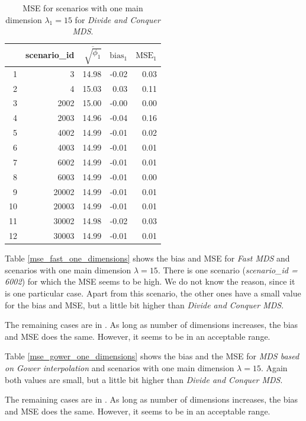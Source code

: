 \documentclass[11pt]{report}
\begin{document}
\begin{table}[ht]
\centering
\begin{tabular}{rrrrr}
 & scenario\_id & $\overline{\sqrt{\phi_1}}$ & $\mbox{bias}_1$ & $\mbox{MSE}_1$ \\ 
  \hline
  1 & 3 & 14.98 & -0.02 & 0.03 \\ 
  2 & 4 & 15.03 & 0.03 & 0.11 \\ 
  3 & 2002 & 15.00 & -0.00 & 0.00 \\ 
  4 & 2003 & 14.96 & -0.04 & 0.16 \\ 
  5 & 4002 & 14.99 & -0.01 & 0.02 \\ 
  6 & 4003 & 14.99 & -0.01 & 0.01 \\ 
  7 & 6002 & 14.99 & -0.01 & 0.01 \\ 
  8 & 6003 & 14.99 & -0.01 & 0.00 \\ 
  9 & 20002 & 14.99 & -0.01 & 0.01 \\ 
  10 & 20003 & 14.99 & -0.01 & 0.01 \\ 
  11 & 30002 & 14.98 & -0.02 & 0.03 \\ 
  12 & 30003 & 14.99 & -0.01 & 0.01 \\ 
   \hline
\end{tabular}
\caption{MSE for scenarios with one main dimension $\lambda_1 = 15$ for \textit{Divide and Conquer MDS}.}
\label{mse_divide_one_dimensions}
\end{table}

\indent Table \ref{mse_fast_one_dimensions} shows the bias and MSE for 
\textit{Fast MDS} and scenarios with one main dimension $\lambda = 15$. 
There is one scenario (\textit{scenario\_id = 6002}) for which the MSE 
seems to be high. We do not know the reason, since it is one particular case. 
Apart from this scenario, the other ones 
have a small value for the bias and MSE, but a little bit higher than 
\textit{Divide and Conquer MDS}.

\indent The remaining cases are in . As long as number of 
dimensions increases, the bias and MSE does the same. However, it seems to
be in an acceptable range.

\indent Table \ref{mse_gower_one_dimensions} shows the bias and the MSE for 
\textit{MDS based on Gower interpolation} and scenarios with one main 
dimension $\lambda = 15$. Again both values are small, but a little bit higher 
than \textit{Divide and Conquer MDS}.

\indent The remaining cases are in . As long as number of 
dimensions increases, the bias and MSE does the same. However, it seems to
be in an acceptable range.
\end{document}

